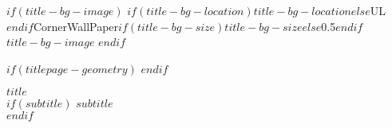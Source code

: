 


$if(title-bg-image)$
  \This$if(title-bg-location)$$title-bg-location$$else$UL$endif$CornerWallPaper{$if(title-bg-size)$$title-bg-size$$else$0.5$endif$}{$title-bg-image$}
$endif$

\begin{tcolorbox}

$if(titlepage-geometry)$
$endif$

\centering

{\Huge\bfseries\nohyphens{$title$}}\\[1\baselineskip]
$if(subtitle)$
  {\huge{$subtitle$}}\\[4\baselineskip]
$endif$

\end{tcolorbox}

\bigbreak

